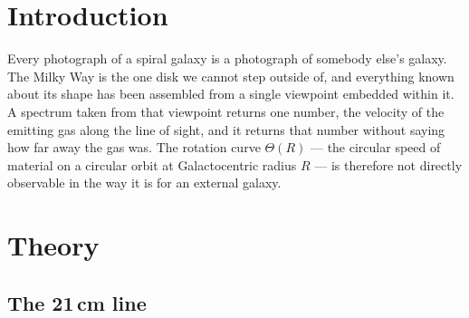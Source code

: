 \documentclass[11pt,a4paper]{article}
\begin{document}
\vspace{0.5cm}
\tableofcontents
\newpage

\section{Introduction}
\label{sec:intro}

Every photograph of a spiral galaxy is a photograph of somebody else's
galaxy. The Milky Way is the one disk we cannot step outside of, and
everything known about its shape has been assembled from a single
viewpoint embedded within it. A spectrum taken from that viewpoint returns
one number, the velocity of the emitting gas along the line of sight, and
it returns that number without saying how far away the gas was. The
rotation curve $\Theta(R)$ --- the circular speed of material on a circular
orbit at Galactocentric radius $R$ --- is therefore not directly observable
in the way it is for an external galaxy.



\section{Theory}
\label{sec:theory}

\subsection{The 21\,cm line}
\label{sec:21cm}
\end{document}
